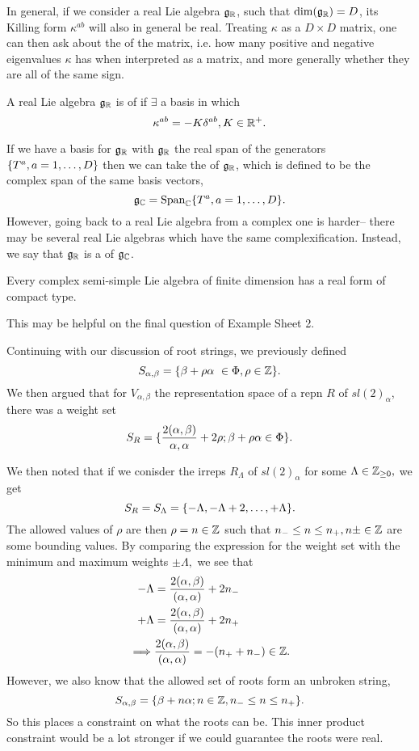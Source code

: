 In general, if we consider a real Lie algebra $\mathfrak{g}_{\mathbb{R}}$, such that $\dim(\mathfrak{g}_{\mathbb{R}})=D$, its Killing form $\kappa^{ab}$ will also in general be real. Treating $\kappa$ as a $D\times D$ matrix, one can then ask about the  of the matrix, i.e. how many positive and negative eigenvalues $\kappa$ has when interpreted as a matrix, and more generally whether they are all of the same sign.
\begin{defn}
A real Lie algebra $\mathfrak{g}_{\mathbb{R}}$ is of  if $\exists$ a basis in which
$$\kappa^{ab}=-K \delta^{ab}, K\in \mathbb{R}^+.$$
\end{defn}
If we have a basis for $\mathfrak{g}_{\mathbb{R}}$ with $\mathfrak{g}_{\mathbb{R}}$ the real span of the generators $\{T^a,a=1,\ldots,D\}$ then we can take the  of $\mathfrak{g}_{\mathbb{R}}$, which is defined to be the complex span of the same basis vectors,
$$\mathfrak{g}_{\mathbb{C}} = \text{Span}_{\mathbb{C}} \{T^a,a=1,\ldots,D\}.$$
However, going back to a real Lie algebra from a complex one is harder-- there may be several real Lie algebras which have the same complexification. Instead, we say that $\mathfrak{g}_{\mathbb{R}}$ is a  of $\mathfrak{g}_{\mathbb{C}}$.

\begin{thm}
Every complex semi-simple Lie algebra of finite dimension has a real form of compact type.
\end{thm}
This may be helpful on the final question of Example Sheet 2.


Continuing with our discussion of root strings, we previously defined
$$S_{\alpha,\beta}=\set{\beta+\rho \alpha\ \in \Phi,\rho\in \ZZ}.$$
We then argued that for $V_{\alpha,\beta}$ the representation space of a repn $R$ of $sl(2)_\alpha$, there was a weight set
$$S_R=\{\frac{2(\alpha,\beta)}{\alpha,\alpha}+2\rho; \beta+\rho\alpha \in \Phi\}.$$

We then noted that if we conisder the irreps $R_\Lambda$ of $sl(2)_\alpha$ for some $\Lambda\in \mathbb{Z}_{\geq 0},$ we get
$$S_R=S_\Lambda=\{-\Lambda,-\Lambda+2,\ldots,+\Lambda\}.$$
The allowed values of $\rho$ are then $\rho=n\in \mathbb{Z}$ such that $n_-\leq n \leq n_+, n\pm \in \mathbb{Z}$ are some bounding values. By comparing the expression for the weight set with the minimum and maximum weights $\pm \Lambda,$ we see that
\begin{align*}
    -\Lambda&= \frac{2(\alpha,\beta)}{(\alpha,\alpha)}+2n_-\\
    +\Lambda &=\frac{2(\alpha,\beta)}{(\alpha,\alpha)}+2n_+\\
    \implies&\frac{2(\alpha,\beta)}{(\alpha,\alpha)}=-(n_+ + n_-)\in \mathbb{Z}.
\end{align*}
However, we also know that the allowed set of roots form an unbroken string,
$$S_{\alpha,\beta}=\{\beta+n\alpha; n\in \mathbb{Z}, n_- \leq n \leq n_+\}.$$
So this places a constraint on what the roots can be. This inner product constraint would be a lot stronger if we could guarantee the roots were real.


